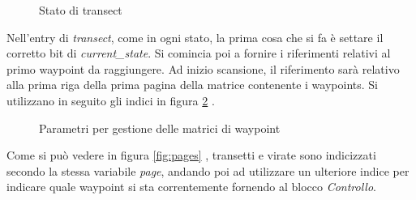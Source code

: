 \documentclass{article}
\begin{document}
            \begin{figure} [ht]
                \caption{Stato di transect}
                \label{fig:transect}
            \end{figure}

            Nell'entry di \emph{transect}, come in ogni stato, la prima cosa che si fa è settare il corretto bit di \emph{current\_state}. Si comincia poi a fornire i riferimenti
            relativi al primo waypoint da raggiungere.
            Ad inizio scansione, il riferimento sarà relativo alla prima riga della prima pagina della matrice contenente i waypoints. Si utilizzano in seguito gli indici in figura \ref{fig:param} .

            \begin{figure} [ht]
                \caption{Parametri per gestione delle matrici di waypoint}
                \label{fig:param}
            \end{figure}

            Come si può vedere in figura \ref{fig:pages} , transetti e virate sono indicizzati secondo la stessa variabile \emph{page}, andando poi ad utilizzare un ulteriore
            indice per indicare quale waypoint si sta correntemente fornendo al blocco \textit{Controllo}.
            
\end{document}
